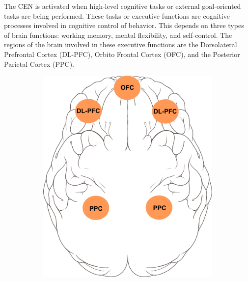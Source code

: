 \documentclass[a4paper, amsfonts, amssymb, amsmath, reprint, showkeys, nofootinbib, twoside]{revtex4-1}
\begin{document}
The CEN is activated when high-level cognitive tasks or external goal-oriented tasks
are being performed. These tasks or executive functions are cognitive processes involved in
cognitive control of behavior. This depends on three types of brain functions:
working memory, mental flexibility, and self-control. The regions of the brain
involved in these executive functions are the Dorsolateral Prefrontal Cortex
(DL-PFC), Orbito Frontal Cortex (OFC), and the Posterior Parietal Cortex (PPC).

\begin{figure}[h!]
  \centering
  \begin{subfigure}[b]{0.48\linewidth}
    \includegraphics[width=\linewidth]{images/top-cen.png}
  \end{subfigure}
  \begin{subfigure}[b]{0.48\linewidth}

\end{subfigure}
\end{figure}
\end{document}
